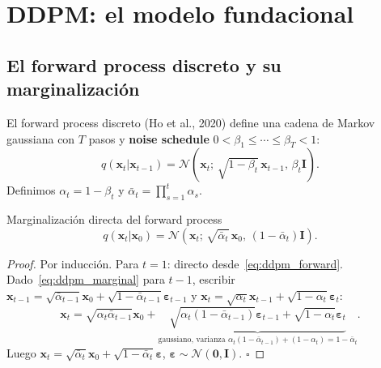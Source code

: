 \section{DDPM: el modelo fundacional}
\label{sec:ddpm}

\subsection{El forward process discreto y su marginalización}
\label{subsec:ddpm_forward}

El forward process discreto (Ho et al., 2020) define una cadena de Markov
gaussiana con $T$ pasos y \textbf{noise schedule} $0 < \beta_1 \leq \cdots
\leq \beta_T < 1$:
\begin{equation}
  q(\bm{x}_t|\bm{x}_{t-1})
  = \mathcal{N}\!\left(\bm{x}_t;\,\sqrt{1-\beta_t}\,\bm{x}_{t-1},\,\beta_t\bm{I}\right).
  \label{eq:ddpm_forward}
\end{equation}
Definimos $\alpha_t = 1-\beta_t$ y $\bar{\alpha}_t = \prod_{s=1}^t\alpha_s$.

\begin{proposicion}{Marginalización directa del forward process}
\label{prop:ddpm_marginal}
\begin{equation}
  q(\bm{x}_t|\bm{x}_0)
  = \mathcal{N}\!\left(\bm{x}_t;\,\sqrt{\bar{\alpha}_t}\,\bm{x}_0,\,
  (1-\bar{\alpha}_t)\bm{I}\right).
  \label{eq:ddpm_marginal}
\end{equation}
\end{proposicion}

\begin{proof}
Por inducción. Para $t=1$: directo desde~\eqref{eq:ddpm_forward}.
Dado~\eqref{eq:ddpm_marginal} para $t-1$, escribir $\bm{x}_{t-1} =
\sqrt{\bar{\alpha}_{t-1}}\bm{x}_0 + \sqrt{1-\bar{\alpha}_{t-1}}\bm{\varepsilon}_{t-1}$
y $\bm{x}_t = \sqrt{\alpha_t}\bm{x}_{t-1} + \sqrt{1-\alpha_t}\bm{\varepsilon}_t$:
\[
  \bm{x}_t
  = \sqrt{\alpha_t\bar{\alpha}_{t-1}}\bm{x}_0
  + \underbrace{\sqrt{\alpha_t(1-\bar{\alpha}_{t-1})}\bm{\varepsilon}_{t-1}
  + \sqrt{1-\alpha_t}\bm{\varepsilon}_t}_{\text{gaussiano, varianza }
  \alpha_t(1-\bar{\alpha}_{t-1})+(1-\alpha_t) = 1-\bar{\alpha}_t}.
\]
Luego $\bm{x}_t = \sqrt{\bar{\alpha}_t}\bm{x}_0 + \sqrt{1-\bar{\alpha}_t}
\bm{\varepsilon}$, $\bm{\varepsilon}\sim\mathcal{N}(\bm{0},\bm{I})$. $\square$
\end{proof}

